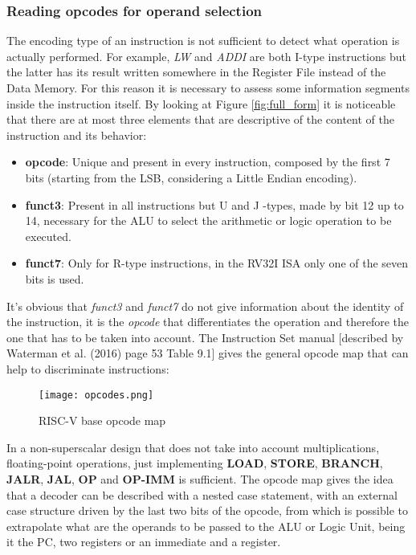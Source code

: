 \subsubsection{Reading opcodes for operand selection}
The encoding type of an instruction is not sufficient to detect what operation is actually performed. For example, \emph{LW} and \emph{ADDI} are both I-type instructions but the latter has its result written somewhere in the Register File instead of the Data Memory.
For this reason it is necessary to assess some information segments inside the instruction itself. By looking at Figure \ref{fig:full_form} it is noticeable that there are at most three elements that are descriptive of the content of the instruction and its behavior:
\begin{itemize}
  \item \textbf{opcode}: Unique and present in every instruction, composed by the first 7 bits (starting from the LSB, considering a Little Endian encoding).
  \item \textbf{funct3}: Present in all instructions but U and J -types, made by bit 12 up to 14, necessary for the ALU to select the arithmetic or logic operation to be executed.
  \item \textbf{funct7}: Only for R-type instructions, in the RV32I ISA only one of the seven bits is used.
\end{itemize}
It's obvious that \emph{funct3} and \emph{funct7} do not give information about the identity of the instruction, it is the \emph{opcode} that differentiates the operation and therefore the one that has to be taken into account. The Instruction Set manual [described by Waterman et al. (2016) \cite{waterman2016riscv} page 53 Table 9.1] gives the general opcode map that can help to discriminate instructions: 

\begin{figure}[h!]
  \centering
  \texttt{[image: opcodes.png]}
  \caption{RISC-V base opcode map \cite{waterman2016riscv}} 
\end{figure}
In a non-superscalar design that does not take into account multiplications, floating-point operations, just implementing \textbf{LOAD}, \textbf{STORE}, \textbf{BRANCH}, \textbf{JALR}, \textbf{JAL}, \textbf{OP} and \textbf{OP-IMM} is sufficient.
The opcode map gives the idea that a decoder can be described with a nested case statement, with an external case structure driven by the last two bits of the opcode, from which is possible to extrapolate what are the operands to be passed to the ALU or Logic Unit, being it the PC, two registers or an immediate and a register.  

